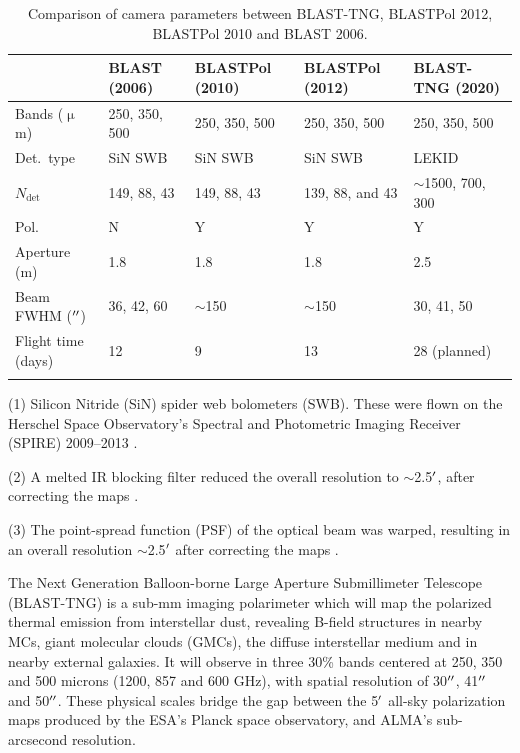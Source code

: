 \begin{table}
\begin{threeparttable}
\centering
\begin{adjustbox}{width=\textwidth}
\begin{tabular}{@{}lllll@{}}
\dtoprule{}
 & BLAST (2006) & BLASTPol (2010) & BLASTPol (2012) & BLAST-TNG (2020) \\ \midrule
Bands ($\upmu$m) & 250, 350, 500 & 250, 350, 500 & 250, 350, 500 & 250, 350, 500 \\
Det.\ type & SiN SWB\tnote{1} & SiN SWB & SiN SWB & LEKID \\
$N_{\mathrm{det}}$ & 149, 88, 43 & 149, 88, 43 & 139, 88, and 43 & $\sim$1500, 700, 300 \\
Pol. & N & Y & Y & Y \\
Aperture (m) & 1.8 & 1.8 & 1.8 & 2.5 \\
Beam FWHM ($\operatorname{^{\prime\prime}}$) & 36, 42, 60 & $\sim$150\tnote{2} & $\sim$150\tnote{3} & 30, 41, 50 \\
Flight time (days) & 12 & 9 & 13 & 28 (planned) \\ \dbottomrule{}
\end{tabular}
\end{adjustbox}
\begin{tablenotes}
\item (1) Silicon Nitride (SiN) spider web bolometers (SWB). These were flown on the Herschel Space Observatory's Spectral and Photometric Imaging Receiver (SPIRE) 2009--2013 \citep{griffin2003spire}.
\item (2) A melted IR blocking filter reduced the overall resolution to $\sim$2.5$\operatorname{^{\prime}}$, after correcting the maps \citep{matthews2014lupus}.
\item (3) The point-spread function (PSF) of the optical beam was warped, resulting in an overall resolution $\sim$2.5$\operatorname{^{\prime}}$ after correcting the maps \citep{fissel2016balloon}.
\end{tablenotes}
\caption[Comparison of camera parameters between BLAST-TNG, BLASTPol 2012, BLASTPol 2010 and BLAST 2006.]{Comparison of camera parameters between BLAST-TNG, BLASTPol 2012, BLASTPol 2010 and BLAST 2006.}
\label{tab:blast_comp}
\end{threeparttable}
\end{table}

The Next Generation Balloon-borne Large Aperture Submillimeter Telescope (BLAST-TNG) is a sub-mm imaging polarimeter which will map the polarized thermal emission from interstellar dust, revealing B-field structures in nearby MCs, giant molecular clouds (GMCs), the diffuse interstellar medium and in nearby external galaxies. It will observe in three 30\% bands centered at 250, 350 and 500 microns (1200, 857 and 600 GHz), with spatial resolution of 30$\operatorname{^{\prime\prime}}$, 41$\operatorname{^{\prime\prime}}$ and 50$\operatorname{^{\prime\prime}}$. These physical scales bridge the gap between the 5$\operatorname{^{\prime}}$ all-sky polarization maps produced by the ESA's Planck space observatory, and ALMA's sub-arcsecond resolution.

